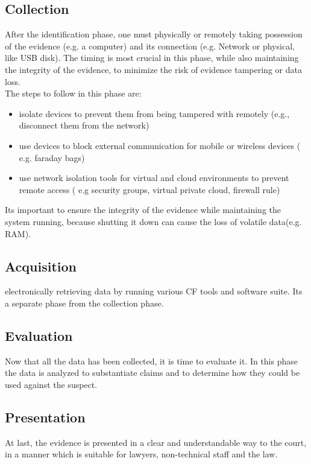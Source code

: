 \subsection{Collection}
After the identification phase, one must physically or remotely taking
possession of the evidence (e.g. a computer) and its connection (e.g.
Network or physical, like USB disk). The timing is most crucial in
this phase, while also maintaining the integrity of the evidence, to
minimize the risk of evidence tampering or data loss.\\
The steps to follow in this phase are:
\begin{itemize}
  \item isolate devices to prevent them from being tampered with
    remotely (e.g., disconnect them from the network)
  \item use devices to block external communication for mobile or
    wireless devices ( e.g. faraday bags)
  \item use network isolation tools for virtual and cloud environments
    to prevent remote access ( e.g security groups, virtual private
    cloud, firewall rule)
\end{itemize}
Its important to ensure the integrity of the evidence while
maintaining the system running, because shutting it down can cause the
loss of volatile data(e.g. RAM).
\subsection{Acquisition}
electronically retrieving data by running various 
CF tools and software suite. Its a separate phase from the collection 
phase.
\subsection{Evaluation}
Now that all the data has been collected, it is time to evaluate it.
In this phase the data is analyzed to substantiate claims and to
determine how they could be used against the suspect.
\subsection{Presentation}
At last, the evidence is presented in a clear and understandable way
to the court, in a manner which is suitable for lawyers, non-technical 
staff and the law.
